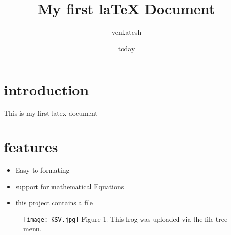 \documentclass{article}
\title{My first laTeX Document}
\author{venkatesh}
\date{today}
\begin{document}
	\maketitle
	\section{introduction}
	This is my first latex document 
	\section{features}
	\begin{itemize}
		\item Easy to formating
		\item support for mathematical Equations
		\item this project contains a file 
	\end{itemize}
	
		\begin{figure}
		\texttt{[image: KSV.jpg]}
		Figure 1: This frog was uploaded via the file-tree menu.
	\end{figure}{\tiny }
	
\end{document}
